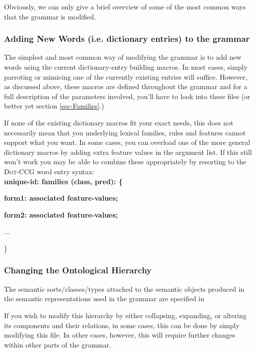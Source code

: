 Obviously, we can only give a brief overview of some of the most common ways that the grammar is modified. 

\subsubsection{Adding New Words (i.e. dictionary entries) to the grammar}

The simplest and most common way of modifying the grammar is to add new words using the current dictionary-entry building macros. In most cases, simply parroting or mimicing one of the currently existing entries will suffice. However, as discussed above, these macros are defined throughout the grammar and for a full description of the parameters involved, you'll have to look into these files (or better yet section \ref{sec-Families}.)
   
If none of the existing dictionary macros fit your exact needs, this does not necessarily mean that you underlying lexical families, rules and features cannot support what you want. In some cases, you can overload one of the more general dictionary macros by adding extra feature values in the argument list. 
If this still won't work you may be able to combine these appropriately by resorting to the \textsc{Dot-CCG} word entry syntax: \\
   
	\textbf{unique-id: families (class, pred): \{ } 

          \textbf{form1: associated feature-values; }  
          
          \textbf{form2: associated feature-values; }  

	...
          
          \}

\subsubsection{Changing the Ontological Hierarchy}
   
   The semantic sorts/classes/types attached to the semantic objects produced in the semantic
   representations used in the grammar are specified in 
   
   If you wish to modify this hierarchy by either collapsing, expanding, or altering its
   components and their relations, in some cases, this can be done by simply modifying this file. 
   In other cases, however, this will require further changes within other parts of the grammar.

